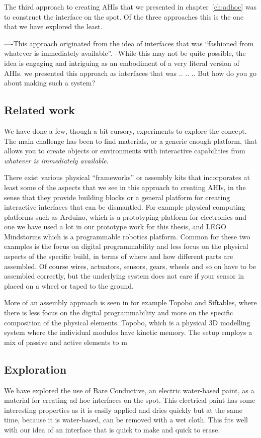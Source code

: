 The third approach to creating AHIs that we presented in chapter~\ref{ch:adhoc} was to construct the interface on the spot.
Of the three approaches this is the one that we have explored the least.

----This approach originated from the idea of interfaces that was ``fashioned from whatever is immediately available''.
--While this may not be quite possible, the idea is engaging and intriguing as an embodiment of a very literal version of AHIs. 
we presented this approach as interfaces that was .. .. .. 
But how do you go about making such a system?

\subsection{Related work}
We have done a few, though a bit cursory, experiments to explore the concept.
The main challenge has been to find materials, or a generic enough platform, that allows you to create objects or environments with interactive capabilities from \emph{whatever is immediately available}. 

There exist various physical ``frameworks'' or assembly kits that incorporates at least some of the aspects that we see in this approach to creating AHIs, in the sense that they provide building blocks or a general platform for creating interactive interfaces that can be dismantled.
For example physical computing platforms such as Arduino, which is a prototyping platform for electronics and one we have used a lot in our prototype work for this thesis, and LEGO Mindstorms which is a programmable robotics platform.
Common for these two examples is the focus on digital programmability and less focus on the physical aspects of the specific build, in terms of where and how different parts are assembled.
Of course wires, actuators, sensors, gears, wheels and so on have to be assembled correctly, but the underlying system does not care if your sensor in placed on a wheel or taped to the ground.

More of an assembly approach is seen in for example Topobo and Siftables, where there is less focus on the digital programmability and more on the specific composition of the physical elements.
Topobo, which is a physical 3D modelling system where the individual modules have kinetic memory. 
The setup employs a mix of passive and active elements to m

\subsection{Exploration}
We have explored the use of Bare Conductive, an electric water-based paint, as a material for creating ad hoc interfaces on the spot.
This electrical paint has some interesting properties as it is easily applied and dries quickly but at the same time, because it is water-based, can be removed with a wet cloth.
This fits well with our idea of an interface that is quick to make and quick to erase.

